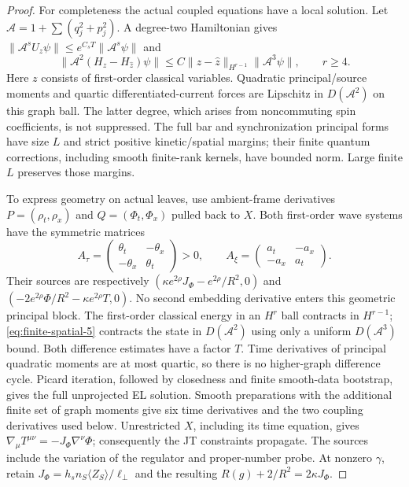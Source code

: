 \begin{proof}
For completeness the actual coupled equations have a local solution.
Let $\mathcal A=1+\sum(q_j^2+p_j^2)$. A degree-two Hamiltonian gives
$\|\mathcal A^sU_z\psi\|\le e^{C_sT}\|\mathcal A^s\psi\|$ and
\begin{equation}
 \|\mathcal A^2(H_z-H_{\hat z})\psi\|
 \le C\|z-\hat z\|_{H^{r-1}}\|\mathcal A^3\psi\|,
 \qquad r\ge4.                                             \label{eq:finite-spatial-5}
\end{equation}
Here $z$ consists of first-order classical variables. Quadratic
principal/source moments and quartic differentiated-current forces are
Lipschitz in $D(\mathcal A^2)$ on this graph ball. The latter degree,
which arises from noncommuting spin coefficients, is not suppressed.
The full bar and synchronization principal forms have size $L$ and
strict positive kinetic/spatial margins; their finite quantum
corrections, including smooth finite-rank kernels, have bounded norm.
Large finite $L$ preserves those margins.

To express geometry on actual leaves, use ambient-frame derivatives
$P=(\rho_t,\rho_x)$ and $Q=(\Phi_t,\Phi_x)$ pulled back to $X$.
Both first-order wave systems have the symmetric matrices
\[
 A_\tau=\begin{pmatrix}\theta_t&-\theta_x\\-\theta_x&\theta_t\end{pmatrix}>0,
 \qquad A_\xi=\begin{pmatrix}a_t&-a_x\\-a_x&a_t\end{pmatrix}.
\]
Their sources are respectively
$(\kappa e^{2\rho}J_\Phi-e^{2\rho}/R^2,0)$ and
$(-2e^{2\rho}\Phi/R^2-\kappa e^{2\rho}T,0)$.
No second embedding derivative enters this geometric principal block.
The first-order classical energy in an $H^r$ ball contracts in
$H^{r-1}$; \eqref{eq:finite-spatial-5} contracts the state in $D(\mathcal A^2)$ using only a
uniform $D(\mathcal A^3)$ bound. Both difference estimates have a
factor $T$. Time derivatives of principal quadratic moments are at
most quartic, so there is no higher-graph difference cycle. Picard
iteration, followed by closedness and finite smooth-data bootstrap,
gives the full unprojected EL solution. Smooth preparations with the
additional finite set of graph moments give six time derivatives and
the two coupling derivatives used below.
Unrestricted $X$, including its time equation, gives
$\nabla_\mu T^{\mu\nu}=-J_\Phi\nabla^\nu\Phi$; consequently the JT
constraints propagate. The sources include the variation of the
regulator and proper-number probe. At nonzero $\gamma$, retain
$J_\Phi=h_sn_S\langle Z_S\rangle/\ell_\perp$ and the resulting
$R(g)+2/R^2=2\kappa J_\Phi$.


\end{proof}
